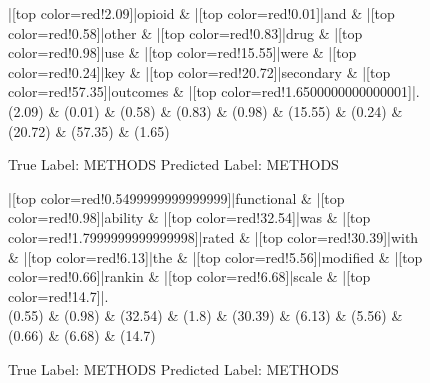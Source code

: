 \documentclass[a4paper, landscape]{article}
\begin{document}
\clearpage
\begin{figure}
\begin{center}
\begin{dependency}
\begin{deptext}
|[top color=red!2.09]|opioid \& |[top color=red!0.01]|and \& |[top color=red!0.58]|other \& |[top color=red!0.83]|drug \& |[top color=red!0.98]|use \& |[top color=red!15.55]|were \& |[top color=red!0.24]|key \& |[top color=red!20.72]|secondary \& |[top color=red!57.35]|outcomes \& |[top color=red!1.6500000000000001]|.\\
(2.09) \& (0.01) \& (0.58) \& (0.83) \& (0.98) \& (15.55) \& (0.24) \& (20.72) \& (57.35) \& (1.65)\\
\end{deptext}
\end{dependency}
\end{center}
\caption{True Label: METHODS Predicted Label: METHODS}
\end{figure}
\clearpage
\begin{figure}
\begin{center}
\begin{dependency}
\begin{deptext}
|[top color=red!0.5499999999999999]|functional \& |[top color=red!0.98]|ability \& |[top color=red!32.54]|was \& |[top color=red!1.7999999999999998]|rated \& |[top color=red!30.39]|with \& |[top color=red!6.13]|the \& |[top color=red!5.56]|modified \& |[top color=red!0.66]|rankin \& |[top color=red!6.68]|scale \& |[top color=red!14.7]|.\\
(0.55) \& (0.98) \& (32.54) \& (1.8) \& (30.39) \& (6.13) \& (5.56) \& (0.66) \& (6.68) \& (14.7)\\
\end{deptext}
\end{dependency}
\end{center}
\caption{True Label: METHODS Predicted Label: METHODS}
\end{figure}
\end{document}
